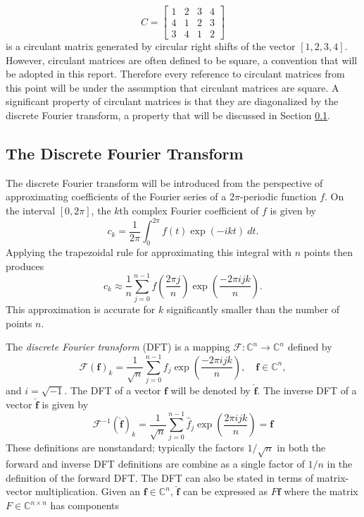 \documentclass[12pt]{article}
\begin{document}
\[C = \begin{bmatrix}
1 & 2 & 3 & 4 \\
4 & 1 & 2 & 3 \\
3 & 4 & 1 & 2
\end{bmatrix}\] 
is a circulant matrix generated by circular right shifts of the vector $[1,2,3,4]$. However, circulant matrices are often defined to be square, a convention that will be adopted in this report. Therefore every reference to circulant matrices from this point will be under the assumption that circulant matrices are square. A significant property of circulant matrices is that they are diagonalized by the discrete Fourier transform, a property that will be discussed in Section \ref{sec:The Discrete Fourier Transform}.

\subsection{The Discrete Fourier Transform} \label{sec:The Discrete Fourier Transform}
The discrete Fourier transform will be introduced from the perspective of approximating coefficients of the Fourier series of a $2\pi$-periodic function $f$. On the interval $[0,2\pi]$, the $k$th complex Fourier coefficient of $f$ is given by
\[c_k = \frac{1}{2\pi}\int_0^{2\pi} f(t)\exp(-ikt)\:dt.\]
Applying the trapezoidal rule for approximating this integral with $n$ points then produces
\[c_k \approx \frac{1}{n}\sum_{j = 0}^{n-1} f\left(\frac{2\pi{j}}{n}\right)\exp\left(\frac{-2\pi{ijk}}{n}\right).\]
This approximation is accurate for $k$ significantly smaller than the number of points $n$. \par 
The \textit{discrete Fourier transform} (DFT) is a mapping $\mathcal{F}:\mathbb{C}^n \rightarrow \mathbb{C}^n$ defined by
\begin{equation}
\mathcal{F}(\mathbf{f})_k = \frac{1}{\sqrt{n}}\sum_{j=0}^{n-1} f_{j}\exp\left(\frac{-2\pi{ijk}}{n}\right), \quad \mathbf{f}\in\mathbb{C}^n,
\label{eq:DFT}
\end{equation}
and $i = \sqrt{-1}$. The DFT of a vector $\mathbf{f}$ will be denoted by $\widehat{\mathbf{f}}$. The inverse DFT of a vector $\widehat{\mathbf{f}}$ is given by
\begin{equation}
\mathcal{F}^{-1}(\widehat{\mathbf{f}})_k = \frac{1}{\sqrt{n}}\sum_{j=0}^{n-1} \widehat{f}_j\exp\left(\frac{2\pi{ijk}}{n}\right) = \mathbf{f}
\end{equation}
These definitions are nonstandard; typically the factors $1/\sqrt{n}$ in both the forward and inverse DFT definitions are combine as a single factor of $1/n$ in the definition of the forward DFT. The DFT can also be stated in terms of matrix-vector multiplication. Given an $\mathbf{f} \in \mathbb{C}^n$, $\widehat{\mathbf{f}}$ can be expressed as $F\mathbf{f}$ where the matrix $F\in\mathbb{C}^{n\times{n}}$ has components
\end{document}
